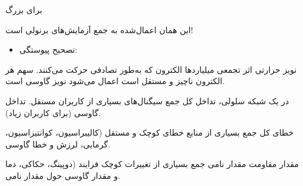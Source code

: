
 برای  بزرگ

این همان  اعمال‌شده به جمع آزمایش‌های برنولی است!

\begin{itemize}
\tightlist
\item
  تصحیح پیوستگی: 
\end{itemize}



نویز حرارتی \lr{=} اثر تجمعی میلیاردها الکترون که به‌طور تصادفی حرکت می‌کنند. سهم هر الکترون ناچیز و مستقل است  اعمال می‌شود \lr{\ensuremath{\to}} نویز گاوسی است.


در یک شبکه سلولی، تداخل کل \lr{=} جمع سیگنال‌های بسیاری از کاربران مستقل.  تداخل \lr{\ensuremath{\approx}} گاوسی (برای کاربران زیاد).


خطای کل \lr{=} جمع بسیاری از منابع خطای کوچک و مستقل (کالیبراسیون، کوانتیزاسیون، گرمایی، لرزش و  خطا \lr{\ensuremath{\approx}} گاوسی.


مقدار مقاومت \lr{=} مقدار نامی \lr{+} جمع بسیاری از تغییرات کوچک فرایند (دوپینگ، حکاکی، دما و  مقدار \lr{\ensuremath{\approx}} گاوسی حول مقدار نامی.


